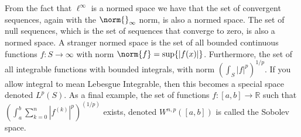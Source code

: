 \documentclass[crop=false,class=article,oneside]{standalone}
\begin{document}
            From the fact that $\ell^{\infty}$ is a normed space
            we have that the set of convergent sequences,
            again with the $\norm{}_{\infty}$ norm, is also
            a normed space. The set of null sequences, which
            is the set of sequences that converge to zero,
            is also a normed space. A stranger normed space
            is the set of all bounded continuous functions
            $f:S\rightarrow\infty$ with norm
            $\norm{f}=\sup\{|f(x)|\}$. Furthermore, the
            set of all integrable functions with
            bounded integrals, with norm
            $(\int_{S}|f|^{p})^{1/p}$. If you allow integral
            to mean Lebesgue Integrable, then this becomes
            a special space denoted $L^{p}(S)$. As a final
            example, the set of functions
            $f:[a,b]\rightarrow\mathbb{R}$ such that
            $(\int_{a}^{b}\sum_{k=0}^{n}|f^{(k)}|^{p})^{(1/p)}$
            exists, denoted $W^{n,p}([a,b])$ is called
            the Sobolev space.
\end{document}
